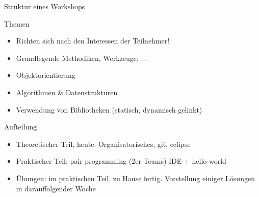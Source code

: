 \begin{frame}{Struktur eines Workshops}
	\begin{block}{Themen}
		\begin{itemize}
			\item Richten sich nach den Interessen der Teilnehmer!
			\item Grundlegende Methodiken, Werkzeuge, ...
			\item Objektorientierung
			\item Algorithmen \& Datenstrukturen
			\item Verwendung von Bibliotheken (statisch, dynamisch gelinkt)
		\end{itemize}
	\end{block}
	\pause
	\begin{block}{Aufteilung}
		\begin{itemize}
			\item Theoretischer Teil, heute: Organisatorisches, git, eclipse
			\item Praktischer Teil: pair programming (2er-Teams) IDE + hello-world
			\item Übungen: im praktischen Teil, zu Hause fertig. Vorstellung einiger Lösungen in darauffolgender Woche
		\end{itemize}
	\end{block}
\end{frame}

